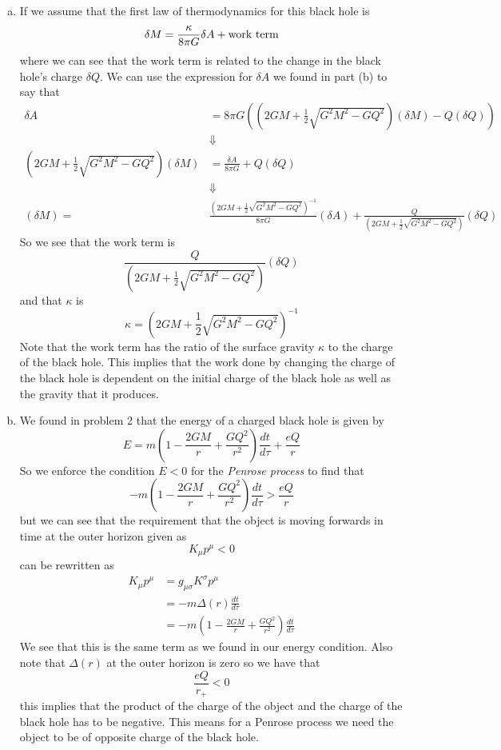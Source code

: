 \documentclass[11pt]{article}
\numberwithin{equation}{section}
\begin{document}
\begin{enumerate}[(a)]
\item
If we assume that the first law of thermodynamics for this black hole is 
$$\delta M = \frac{\kappa}{8\pi G}\delta A + \textnormal{work term}$$
where we can see that the work term is related to the change in the black hole's charge $\delta Q$. We can use the expression for $\delta A$ we found in part (b) to say that
\begin{align*}
\delta A &= 8\pi G\left(\left(2GM  + \frac{1}{2}\sqrt{G^2M^2-GQ^2}\right)(\delta M)- Q(\delta Q)\right)\\ 
&\Downarrow\\
\left(2GM  + \frac{1}{2}\sqrt{G^2M^2-GQ^2}\right)(\delta M) &= \frac{\delta A}{8\pi G}  + Q(\delta Q) \\
&\Downarrow\\
(\delta M) = &\frac{\left(2GM  + \frac{1}{2}\sqrt{G^2M^2-GQ^2}\right)^{-1}}{8\pi G}(\delta A)  + \frac{Q}{\left(2GM  + \frac{1}{2}\sqrt{G^2M^2-GQ^2}\right)}(\delta Q)
\end{align*}
So we see that the work term is
$$\frac{Q}{\left(2GM  + \frac{1}{2}\sqrt{G^2M^2-GQ^2}\right)}(\delta Q)$$
and that $\kappa$ is 
$$\kappa = \left(2GM  + \frac{1}{2}\sqrt{G^2M^2-GQ^2}\right)^{-1}$$ 
Note that the work term has the ratio of the surface gravity $\kappa$ to the charge of the black hole. This implies that the work done by changing the charge of the black hole is dependent on the initial charge of the black hole as well as the gravity that it produces.

\item
We found in problem 2 that the energy of a charged black hole is given by
$$E =  m\left(1-\frac{2GM}{r} + \frac{GQ^2}{r^2}\right)\frac{dt}{d\tau} + \frac{eQ}{r}$$
So we enforce the condition $E<0$ for the \emph{Penrose process} to find that
$$-m\left(1-\frac{2GM}{r} + \frac{GQ^2}{r^2}\right)\frac{dt}{d\tau} > \frac{eQ}{r}$$
but we can see that the requirement that the object is moving forwards in time at the outer horizon given as
$$K_{\mu}p^{\mu}<0$$
can be rewritten as
\begin{align*}
K_{\mu}p^{\mu} &= g_{\mu\sigma}K^{\sigma}p^{\mu}\\
&= -m\Delta(r)\frac{dt}{d\tau}\\
&= -m\left(1-\frac{2GM}{r} + \frac{GQ^2}{r^2}\right)\frac{dt}{d\tau}
\end{align*}
We see that this is the same term as we found in our energy condition. Also note that $\Delta(r)$ at the outer horizon is zero so we have that 
$$\frac{eQ}{r_+} < 0$$
this implies that the product of the charge of the object and the charge of the black hole has to be negative. This means for a Penrose process we need the object to be of opposite charge of the black hole.



\end{enumerate}
\end{document}
